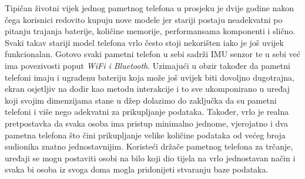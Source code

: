\documentclass[times, utf8, diplomski]{fer}
\begin{document}
Tipičan životni vijek jednog pametnog telefona u prosjeku je dvije godine nakon čega korisnici redovito kupuju nove modele jer stariji postaju neadekvatni
po pitanju trajanja baterije, količine memorije, performansama komponenti i slično. Svaki takav stariji model telefona vrlo često stoji nekorišten iako je još uvijek
funkcionalan. Gotovo svaki pametni telefon u sebi sadrži IMU senzor te u sebi već ima povezivosti poput \textit{WiFi i Bluetooth}. Uzimajući u obzir
također da pametni telefoni imaju i ugrađenu bateriju koja može još uvijek biti dovoljno dugotrajna, ekran osjetljiv na dodir kao metodu interakcije i to 
sve ukomponirano u uređaj koji svojim dimenzijama stane u džep dolazimo do zaključka da su pametni telefoni i više nego adekvatni za prikupljanje podataka.
Također, vrlo je realna pretpostavka da svaka osoba ima pristup minimalno jednome, vjerojatno i dva pametna telefona što čini prikupljanje velike količine
podataka od većeg broja sudionika znatno jednostavnijim. Koristeći držače pametnog telefona za trčanje, uređaji se mogu postaviti osobi na bilo koji
dio tijela na vrlo jednostavan način i svaka bi osoba iz svoga doma mogla pridonijeti stvaranju baze podataka.
\end{document}
